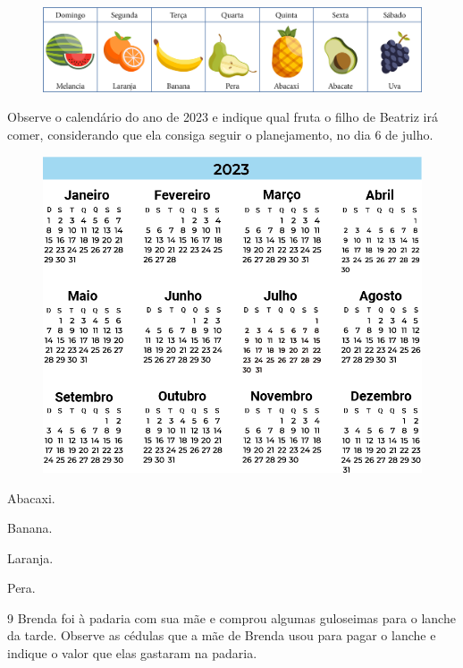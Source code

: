 \begin{figure}[H]
\includegraphics[width=\textwidth]{./media/image143.png}
\end{figure}

Observe o calendário do ano de 2023 e indique qual fruta o filho de
Beatriz irá comer, considerando que ela consiga seguir o planejamento, no dia 6 de julho.

\begin{figure}[H]
\includegraphics[width=\textwidth]{./media/image144.png}
\end{figure}

\begin{escolha}[itemsep=-5pt]
\item Abacaxi.

\item Banana.

\item Laranja.

\item Pera.
\end{escolha}

\num{9} Brenda foi à padaria com sua mãe e comprou algumas guloseimas para o
lanche da tarde. Observe as cédulas que a mãe de Brenda usou para pagar
o lanche e indique o valor que elas gastaram na padaria.

